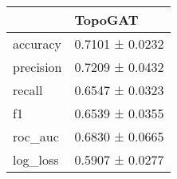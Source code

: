 \begin{tabular}{ll}
\toprule
 & TopoGAT \\
\midrule
accuracy & 0.7101 ± 0.0232 \\
precision & 0.7209 ± 0.0432 \\
recall & 0.6547 ± 0.0323 \\
f1 & 0.6539 ± 0.0355 \\
roc_auc & 0.6830 ± 0.0665 \\
log_loss & 0.5907 ± 0.0277 \\
\bottomrule
\end{tabular}
